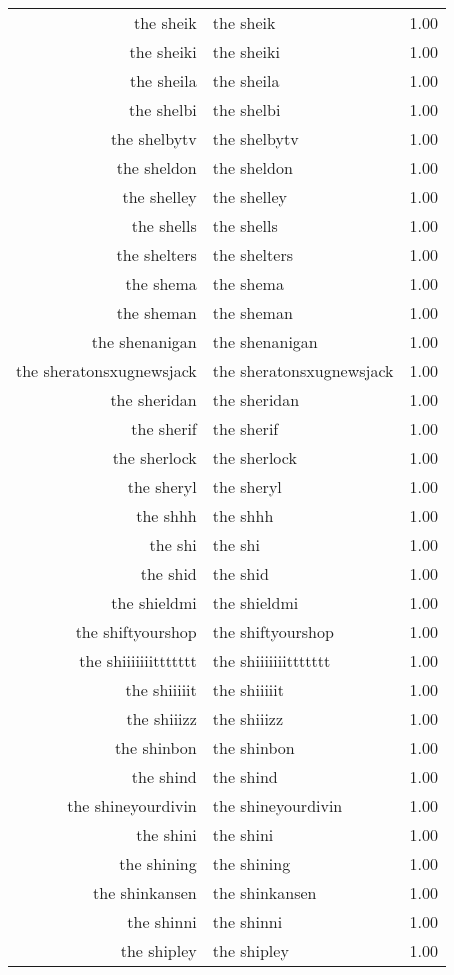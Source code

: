 \begin{table}[ht]
\begin{tabular}{rlr}
  the sheik & the sheik & 1.00 \\ 
  the sheiki & the sheiki & 1.00 \\ 
  the sheila & the sheila & 1.00 \\ 
  the shelbi & the shelbi & 1.00 \\ 
  the shelbytv & the shelbytv & 1.00 \\ 
  the sheldon & the sheldon & 1.00 \\ 
  the shelley & the shelley & 1.00 \\ 
  the shells & the shells & 1.00 \\ 
  the shelters & the shelters & 1.00 \\ 
  the shema & the shema & 1.00 \\ 
  the sheman & the sheman & 1.00 \\ 
  the shenanigan & the shenanigan & 1.00 \\ 
  the sheratonsxugnewsjack & the sheratonsxugnewsjack & 1.00 \\ 
  the sheridan & the sheridan & 1.00 \\ 
  the sherif & the sherif & 1.00 \\ 
  the sherlock & the sherlock & 1.00 \\ 
  the sheryl & the sheryl & 1.00 \\ 
  the shhh & the shhh & 1.00 \\ 
  the shi & the shi & 1.00 \\ 
  the shid & the shid & 1.00 \\ 
  the shieldmi & the shieldmi & 1.00 \\ 
  the shiftyourshop & the shiftyourshop & 1.00 \\ 
  the shiiiiiiittttttt & the shiiiiiiittttttt & 1.00 \\ 
  the shiiiiit & the shiiiiit & 1.00 \\ 
  the shiiizz & the shiiizz & 1.00 \\ 
  the shinbon & the shinbon & 1.00 \\ 
  the shind & the shind & 1.00 \\ 
  the shineyourdivin & the shineyourdivin & 1.00 \\ 
  the shini & the shini & 1.00 \\ 
  the shining & the shining & 1.00 \\ 
  the shinkansen & the shinkansen & 1.00 \\ 
  the shinni & the shinni & 1.00 \\ 
  the shipley & the shipley & 1.00 \\ 

\end{tabular}
\end{table}
